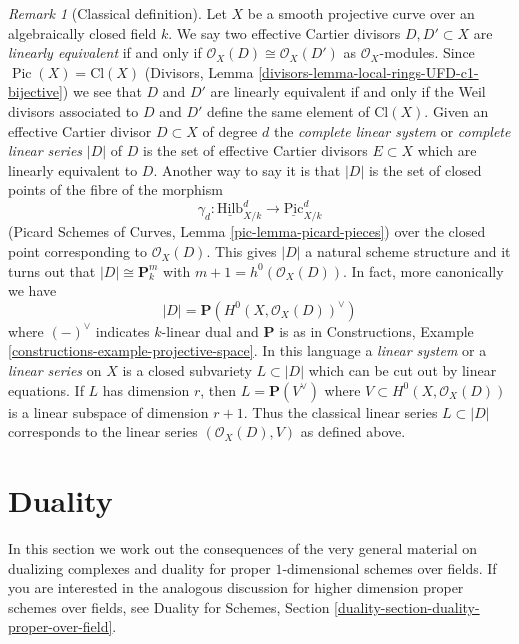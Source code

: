 \documentclass{stacks-project}
\theoremstyle{plain}
\theoremstyle{definition}
\theoremstyle{remark}
\newtheorem{remark}[subsection]{Remark}
\numberwithin{equation}{subsection}
\def\Hilbfunctor{\mathrm{Hilb}}
\def\Pic{\mathop{\mathrm{Pic}}\nolimits}
\def\Picardfunctor{\mathrm{Pic}}
\begin{document}
\begin{remark}[Classical definition]
\label{remark-classical-linear-series}
Let $X$ be a smooth projective curve over an algebraically closed field $k$.
We say two effective Cartier divisors $D, D' \subset X$ are
{\it linearly equivalent} if and only if
$\mathcal{O}_X(D) \cong \mathcal{O}_X(D')$ as $\mathcal{O}_X$-modules.
Since $\Pic(X) = \text{Cl}(X)$
(Divisors, Lemma \ref{divisors-lemma-local-rings-UFD-c1-bijective})
we see that $D$ and $D'$ are linearly equivalent
if and only if the Weil divisors associated to
$D$ and $D'$ define the same element of $\text{Cl}(X)$.
Given an effective Cartier divisor $D \subset X$ of degree $d$ the
{\it complete linear system} or {\it complete linear series} $|D|$ of $D$
is the set of effective Cartier divisors $E \subset X$
which are linearly equivalent to $D$.
Another way to say it is that $|D|$ is the set of closed
points of the fibre of the morphism
$$
\gamma_d :
\underline{\Hilbfunctor}^d_{X/k}
\longrightarrow
\underline{\Picardfunctor}^d_{X/k}
$$
(Picard Schemes of Curves, Lemma \ref{pic-lemma-picard-pieces})
over the closed point corresponding to $\mathcal{O}_X(D)$.
This gives $|D|$ a natural scheme structure and it
turns out that $|D| \cong \mathbf{P}^m_k$ with
$m + 1 = h^0(\mathcal{O}_X(D))$. In fact, more canonically we have
$$
|D| = \mathbf{P}(H^0(X, \mathcal{O}_X(D))^\vee)
$$
where $(-)^\vee$ indicates $k$-linear dual and $\mathbf{P}$ is as
in Constructions, Example \ref{constructions-example-projective-space}.
In this language a {\it linear system} or a {\it linear series} on
$X$ is a closed subvariety $L \subset |D|$ which can be cut out by
linear equations. If $L$ has dimension $r$, then $L = \mathbf{P}(V^\vee)$
where $V \subset H^0(X, \mathcal{O}_X(D))$ is a linear subspace
of dimension $r + 1$. Thus the classical linear series
$L \subset |D|$ corresponds to the linear series $(\mathcal{O}_X(D), V)$
as defined above.
\end{remark}







\section{Duality}
\label{section-duality}

\noindent
In this section we work out the consequences of the very general
material on dualizing complexes and duality for proper $1$-dimensional
schemes over fields. If you are interested in the analogous discussion
for higher dimension proper schemes over fields, see
Duality for Schemes, Section \ref{duality-section-duality-proper-over-field}.
\end{document}
